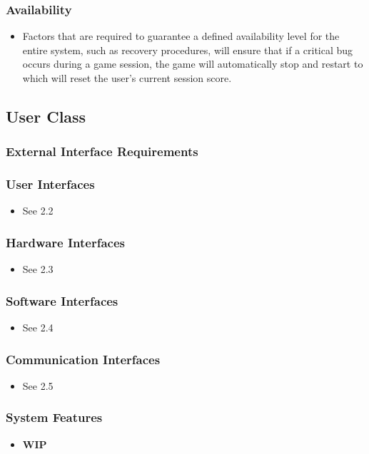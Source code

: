 \documentclass{article}
\begin{document}
\subsubsection{Availability}
\begin{itemize}
    \item Factors that are required to guarantee a defined availability level for the entire system, such as recovery procedures, 
    will ensure that if a critical bug occurs during a game session, the game will automatically stop and restart to which will reset the user's current session score. 
\end{itemize}

\subsection{User Class}
\subsubsection{External Interface Requirements}
\subsubsection{User Interfaces}
\begin{itemize}
    \item See 2.2
\end{itemize}
\subsubsection{Hardware Interfaces}
\begin{itemize}
    \item See 2.3
\end{itemize}
\subsubsection{Software Interfaces}
\begin{itemize}
    \item See 2.4
\end{itemize}
\subsubsection{Communication Interfaces}
\begin{itemize}
    \item See 2.5
\end{itemize}
\subsubsection{System Features}
\begin{itemize}
    \item \textbf{WIP}
\end{itemize}
\end{document}
